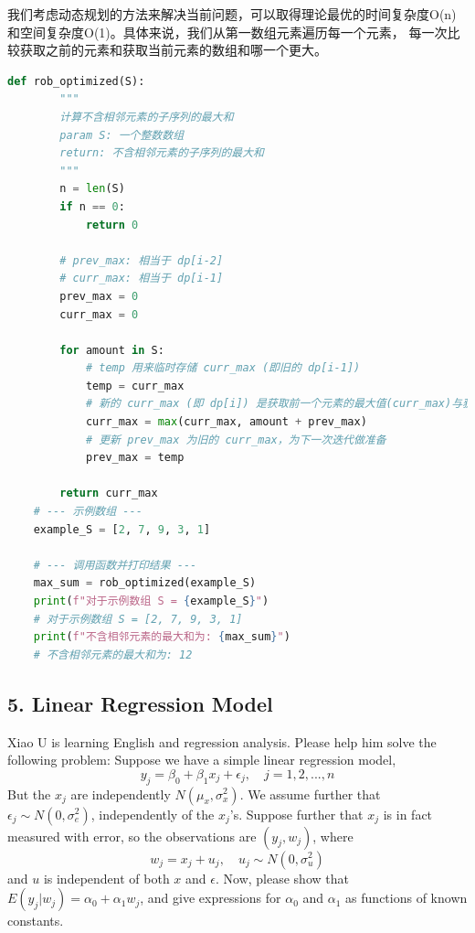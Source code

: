 \documentclass[UTF8]{ctexart}
\begin{document}
我们考虑动态规划的方法来解决当前问题，可以取得理论最优的时间复杂度O(n)和空间复杂度O(1)。具体来说，我们从第一数组元素遍历每一个元素，
每一次比较获取之前的元素和获取当前元素的数组和哪一个更大。
\begin{lstlisting}[language=Python, caption=O(1) 空间复杂度 和 O(n) 时间复杂度的解法]
    def rob_optimized(S):
        """
        计算不含相邻元素的子序列的最大和
        param S: 一个整数数组
        return: 不含相邻元素的子序列的最大和
        """
        n = len(S)
        if n == 0:
            return 0
        
        # prev_max: 相当于 dp[i-2]
        # curr_max: 相当于 dp[i-1]
        prev_max = 0
        curr_max = 0
    
        for amount in S:
            # temp 用来临时存储 curr_max (即旧的 dp[i-1])
            temp = curr_max
            # 新的 curr_max (即 dp[i]) 是获取前一个元素的最大值(curr_max)与获得当前元素(amount + prev_max)的较大值
            curr_max = max(curr_max, amount + prev_max)
            # 更新 prev_max 为旧的 curr_max，为下一次迭代做准备
            prev_max = temp
    
        return curr_max
    # --- 示例数组 ---
    example_S = [2, 7, 9, 3, 1]

    # --- 调用函数并打印结果 ---
    max_sum = rob_optimized(example_S)
    print(f"对于示例数组 S = {example_S}")
    # 对于示例数组 S = [2, 7, 9, 3, 1]
    print(f"不含相邻元素的最大和为: {max_sum}") 
    # 不含相邻元素的最大和为: 12
\end{lstlisting}

\subsection*{5. Linear Regression Model}
Xiao U is learning English and regression analysis. Please help him solve the following problem:
Suppose we have a simple linear regression model,
$$ y_{j}=\beta_{0}+\beta_{1}x_{j}+\epsilon_{j}, \quad j=1,2,...,n $$
But the $x_{j}$ are independently $N(\mu_{x},\sigma_{x}^{2})$. We assume further that $\epsilon_{j}\sim N(0,\sigma_{e}^{2})$, independently of the $x_{j}$'s.
Suppose further that $x_{j}$ is in fact measured with error, so the observations are $(y_{j},w_{j})$, where
$$ w_{j}=x_{j}+u_{j}, \quad u_{j}\sim N(0,\sigma_{u}^{2}) $$
and $u$ is independent of both $x$ and $\epsilon$.
Now, please show that $E(y_{j}|w_{j})=\alpha_{0}+\alpha_{1}w_{j}$, and give expressions for $\alpha_{0}$ and $\alpha_{1}$ as functions of known constants.
\end{document}
